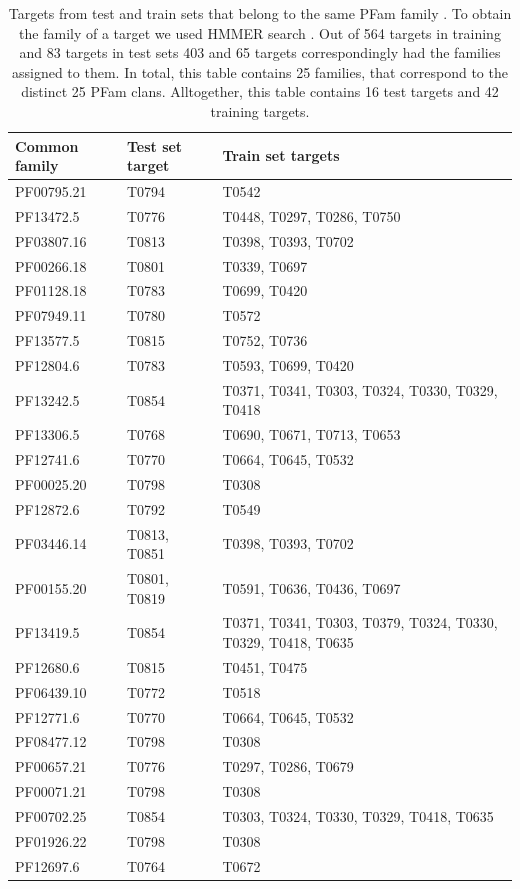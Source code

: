 \documentclass[a4paper,10pt]{article}
\begin{document}
\begin{table}[H]
\begin{center}
\begin{tabular}{ l | l | l }

    Common family & Test set target & Train set targets \\
    \hline
    PF00795.21 & T0794 & T0542 \\ \hline
    PF13472.5 & T0776 & T0448, T0297, T0286, T0750 \\ \hline
    PF03807.16 & T0813 & T0398, T0393, T0702 \\ \hline
    PF00266.18 & T0801 & T0339, T0697 \\ \hline
    PF01128.18 & T0783 & T0699, T0420 \\ \hline
    PF07949.11 & T0780 & T0572 \\ \hline
    PF13577.5 & T0815 & T0752, T0736 \\ \hline
    PF12804.6 & T0783 & T0593, T0699, T0420 \\ \hline
    PF13242.5 & T0854 & T0371, T0341, T0303, T0324, T0330, T0329, T0418 \\ \hline
    PF13306.5 & T0768 & T0690, T0671, T0713, T0653 \\ \hline
    PF12741.6 & T0770 & T0664, T0645, T0532 \\ \hline
    PF00025.20 & T0798 & T0308 \\ \hline
    PF12872.6 & T0792 & T0549 \\ \hline
    PF03446.14 & T0813, T0851 & T0398, T0393, T0702 \\ \hline
    PF00155.20 & T0801, T0819 & T0591, T0636, T0436, T0697 \\ \hline
    PF13419.5 & T0854 & T0371, T0341, T0303, T0379, T0324, T0330, T0329, T0418, T0635 \\ \hline
    PF12680.6 & T0815 & T0451, T0475 \\ \hline
    PF06439.10 & T0772 & T0518 \\ \hline
    PF12771.6 & T0770 & T0664, T0645, T0532 \\ \hline
    PF08477.12 & T0798 & T0308 \\ \hline
    PF00657.21 & T0776 & T0297, T0286, T0679 \\ \hline
    PF00071.21 & T0798 & T0308 \\ \hline
    PF00702.25 & T0854 & T0303, T0324, T0330, T0329, T0418, T0635 \\ \hline
    PF01926.22 & T0798 & T0308 \\ \hline
    PF12697.6 & T0764 & T0672 \\ \hline
\end{tabular}
    
\caption {Targets from test and train sets that belong to the same PFam family \cite{}. To obtain the family of a target we used HMMER search \cite{}.
Out of 564 targets in training and 83 targets in test sets 403 and 65 targets correspondingly had the families assigned to them. In total, this 
table contains 25 families, that correspond to the distinct 25 PFam clans. Alltogether, this table contains 16 test targets and 42 training targets.}
\label{Tbl:SharedPFam}
\end{center}
\end{table}
\end{document}
